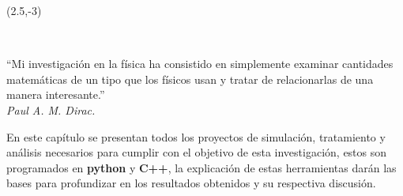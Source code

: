 \begin{textblock}{9}(2.5,-3)
\begin{flushright}
\setlength{\baselineskip}{15pt}
~

``Mi investigación en la física ha consistido en simplemente examinar cantidades matemáticas de un tipo que los físicos usan y tratar de relacionarlas de una manera interesante.''\\[.5cm]
\textit{Paul A. M. Dirac.}
\end{flushright}
\end{textblock}

En este capítulo se presentan todos los proyectos de simulación, tratamiento y análisis necesarios para cumplir con el objetivo de esta investigación, estos son programados en \textbf{python} y \textbf{C++}, la explicación de estas herramientas darán las bases para profundizar en los resultados obtenidos y su respectiva discusión.